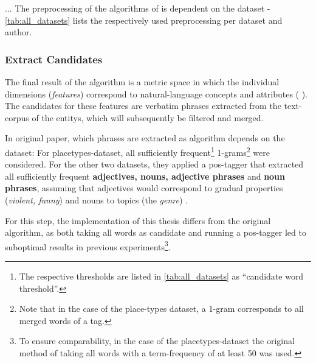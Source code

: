 ... The preprocessing of the algorithms of \mainalgos is dependent on the dataset - \autoref{tab:all_datasets} lists the respectively used preprocessing per dataset and author.


\subsubsection{Extract Candidates}
\label{sec:extract_cands}

The final result of the algorithm is a metric space in which the individual dimensions (\emph{\glspl{feature}}) correspond to natural-language concepts and attributes ( \cite{Derrac2015}). The candidates for these features are verbatim phrases extracted from the text-corpus of the \glspl{entity}, which will subsequently be filtered and merged.

In  original paper, which phrases are extracted as algorithm depends on the dataset: For placetypes-dataset, all sufficiently frequent\footnote{\label{fnote:cand_thresholds}The respective thresholds are listed in \autoref{tab:all_datasets} as ``candidate word threshold''.} 1-grams\footnote{Note that in the case of the place-types dataset, a 1-gram corresponds to all merged words of a tag.} were considered. For the other two datasets, they applied a \gls{pos}-tagger that extracted all sufficiently frequent \textbf{adjectives, nouns, adjective phrases} and \textbf{noun phrases}, assuming that adjectives would correspond to gradual properties (\eg \textit{violent, funny}) and nouns to topics (\eg the \textit{genre}) \cite[Sec. 4.2.1]{Derrac2015}.

For this step, the implementation of this thesis differs from the original algorithm, as both taking all words as candidate and running a \gls{pos}-tagger led to suboptimal results in previous experiments\footnote{To ensure comparability, in the case of the placetypes-dataset the original method of taking all words with a term-frequency of at least 50 was used.}. 

